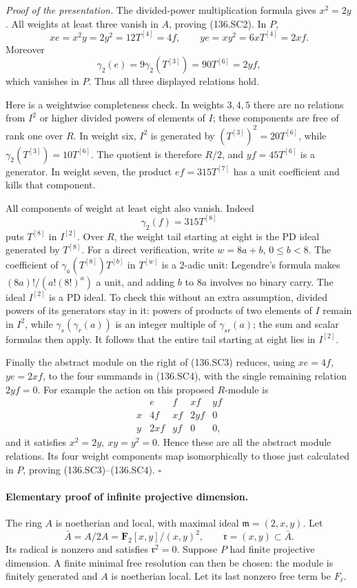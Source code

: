 \emph{Proof of the presentation.}
The divided-power multiplication formula gives \(x^2=2y\).
All weights at least three vanish in \(A\), proving (136.SC2).
In \(P\),
\[
 xe=x^2y=2y^2=12T^{[4]}=4f,\qquad
 ye=xy^2=6xT^{[4]}=2xf.
\]
Moreover
\[
 \gamma_2(e)=9\gamma_2(T^{[3]})
            =90T^{[6]}=2yf,
\]
which vanishes in \(P\). Thus all three displayed relations hold.

Here is a weightwise completeness check. In weights \(3,4,5\)
there are no relations from \(I^2\) or higher divided powers of
elements of \(I\); these components are free of rank one over \(R\).
In weight six, \(I^2\) is generated by
\((T^{[3]})^2=20T^{[6]}\), while
\(\gamma_2(T^{[3]})=10T^{[6]}\).
The quotient is therefore \(R/2\), and \(yf=45T^{[6]}\) is a
generator. In weight seven, the product
\(ef=315T^{[7]}\) has a unit coefficient and kills that component.

All components of weight at least eight also vanish. Indeed
\[
                       \gamma_2(f)=315T^{[8]}
\]
puts \(T^{[8]}\) in \(I^{[2]}\). Over \(R\), the weight tail starting
at eight is the PD ideal generated by \(T^{[8]}\).
For a direct verification, write \(w=8a+b\), \(0\leq b<8\).
The coefficient of
\(\gamma_a(T^{[8]})T^{[b]}\) in \(T^{[w]}\) is a \(2\)-adic unit:
Legendre's formula makes
\((8a)!/(a!(8!)^a)\) a unit, and adding \(b\) to \(8a\) involves
no binary carry. The ideal \(I^{[2]}\) is a PD ideal. To check
this without an extra assumption, divided powers of its generators
stay in it: powers of products of two elements of \(I\) remain in
\(I^2\), while
\(\gamma_s(\gamma_r(a))\) is an integer multiple of
\(\gamma_{sr}(a)\); the sum and scalar formulas then apply.
It follows that the entire tail starting at eight lies in
\(I^{[2]}\).

Finally the abstract module on the right of (136.SC3) reduces,
using \(xe=4f\), \(ye=2xf\), to the four summands in (136.SC4),
with the single remaining relation \(2yf=0\).
For example the action on this proposed \(R\)-module is
\[
 \begin{array}{c|cccc}
       &e&f&xf&yf\\ \hline
 x     &4f&xf&2yf&0\\
 y     &2xf&yf&0&0 ,
 \end{array}
\]
and it satisfies \(x^2=2y,\ xy=y^2=0\).
Hence these are all the abstract module relations. Its four
weight components map isomorphically to those just calculated
in \(P\), proving (136.SC3)--(136.SC4).
\hfill\(\square\)

\paragraph{Elementary proof of infinite projective dimension.}
The ring \(A\) is noetherian and local, with maximal ideal
\(\mathfrak m=(2,x,y)\). Let
\[
 \bar A=A/2A
       =\mathbf F_2[x,y]/(x,y)^2,\qquad
 \mathfrak r=(x,y)\subset\bar A.
 \tag{136.SC5}
\]
Its radical is nonzero and satisfies \(\mathfrak r^2=0\).
Suppose \(P\) had finite projective dimension. A finite minimal
free resolution can then be chosen: the module is finitely
generated and \(A\) is noetherian local. Let its last nonzero
free term be \(F_\ell\).

